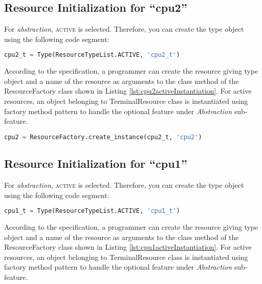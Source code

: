 \documentclass[]{scrartcl}
\begin{document}
\subsection{Resource Initialization for ``\textsf{cpu2}''}
        
For \emph{abstraction}, \textsc{active} is selected. Therefore, you can create the type object using the following code segment:

\begin{lstlisting}[language=Python, frame=single, label={lst:activeType}, caption={Active resource type object instantiation}]
cpu2_t = Type(ResourceTypeList.ACTIVE, 'cpu2_t')
\end{lstlisting}
        
        
According to the specification, a programmer can create the resource giving type object and a name of the resource as arguments to the class method of the
ResourceFactory class shown in Listing \ref{lst:cpu2activeInstantiation}. For active resources, an object belonging to \textsf{TerminalResource} class is instantiated
using factory method pattern to handle the optional feature under \emph{Abstraction} sub-feature.


\begin{lstlisting}[language=Python, frame=single, label={lst:cpu2activeInstantiation}, caption={Active resource instantiation using ResourceFactory class}]
cpu2 = ResourceFactory.create_instance(cpu2_t, 'cpu2')
\end{lstlisting}
        

\subsection{Resource Initialization for ``\textsf{cpu1}''}
        
For \emph{abstraction}, \textsc{active} is selected. Therefore, you can create the type object using the following code segment:

\begin{lstlisting}[language=Python, frame=single, label={lst:activeType}, caption={Active resource type object instantiation}]
cpu1_t = Type(ResourceTypeList.ACTIVE, 'cpu1_t')
\end{lstlisting}
        
        
According to the specification, a programmer can create the resource giving type object and a name of the resource as arguments to the class method of the
ResourceFactory class shown in Listing \ref{lst:cpu1activeInstantiation}. For active resources, an object belonging to \textsf{TerminalResource} class is instantiated
using factory method pattern to handle the optional feature under \emph{Abstraction} sub-feature.
\end{document}
